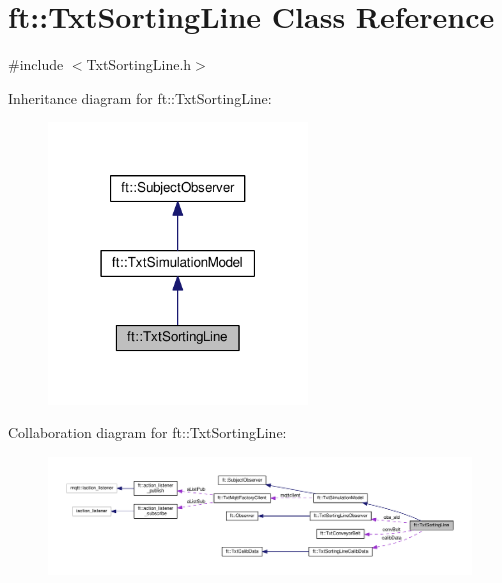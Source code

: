 \hypertarget{classft_1_1_txt_sorting_line}{}\section{ft\+:\+:Txt\+Sorting\+Line Class Reference}
\label{classft_1_1_txt_sorting_line}


{\ttfamily \#include $<$Txt\+Sorting\+Line.\+h$>$}



Inheritance diagram for ft\+:\+:Txt\+Sorting\+Line\+:
\nopagebreak
\begin{figure}[H]
\begin{center}
\leavevmode
\includegraphics[width=195pt]{classft_1_1_txt_sorting_line__inherit__graph}
\end{center}
\end{figure}


Collaboration diagram for ft\+:\+:Txt\+Sorting\+Line\+:
\nopagebreak
\begin{figure}[H]
\begin{center}
\leavevmode
\includegraphics[width=350pt]{classft_1_1_txt_sorting_line__coll__graph}
\end{center}
\end{figure}

